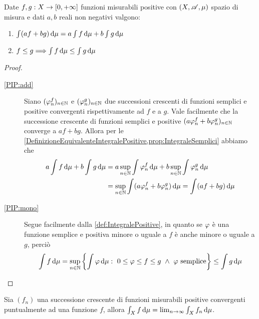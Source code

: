 \begin{proposition}\label{prop:IntegralePositive}
	Date $f,g:X\to[0,+\infty]$ funzioni misurabili positive con $(X,\mathscr A,\mu)$ spazio di misura e dati $a,b$ reali non negativi valgono:
	\begin{enumerate}
		\item $\int (af+bg)\,\mathrm d\mu=a\int f\,\mathrm d\mu+b\int g\,\mathrm d\mu$ \label{PIP:add}
		\item $f\le g\Longrightarrow \int f\,\mathrm d\mu\le \int g\,\mathrm d\mu$ \label{PIP:mono}
	\end{enumerate}
\end{proposition}
\begin{proof}
	\begin{description}
		\item[\ref{PIP:add}] Siano $(\varphi_n^f)_{n\in\mathbb N}$ e $(\varphi_n^g)_{n\in\mathbb N}$ due successioni crescenti di funzioni semplici e positive convergenti rispettivamente ad $f$ e a $g$. Vale facilmente che la successione crescente di funzioni semplici e positive $(a\varphi_n^f+b\varphi_n^g)_{n\in\mathbb N}$ converge a $af+bg$. Allora per le \cref{DefinizioneEquivalenteIntegralePositive,prop:IntegraleSemplici} abbiamo che
		\begin{equation*}
		\begin{split}
			a\int f\,\mathrm d\mu+b\int g\,\mathrm d\mu&=a\sup_{n\in\mathbb N}\int \varphi_n^f\,\mathrm d\mu+b\sup_{n\in\mathbb N}\int \varphi_n^g\,\mathrm d\mu \\
			&=\sup_{n\in\mathbb N}\int (a\varphi_n^f+b\varphi_n^g)\,\mathrm d\mu=\int (af+bg)\,\mathrm d\mu
		\end{split}
		\end{equation*}
		
		\item[\ref{PIP:mono}] Segue facilmente dalla \cref{def:IntegralePositive}, in quanto se $\varphi$ è una funzione semplice e positiva minore o uguale a $f$ è anche minore o uguale a $g$, perciò
		\begin{equation*}
		\int f\de\mu=\sup_{n\in\N}\left\{\int\simp\de \mu:\ 0\le \simp\le f\le g\ \wedge\ \simp \text{ semplice}\right\}\le \int g\de\mu
	\end{equation*}
	\end{description}
\end{proof}

\begin{theorem}\label{thm:BeppoLevi}
	Sia $(f_n)$ una successione crescente di funzioni misurabili positive convergenti puntualmente ad una funzione $f$, allora $\int_Xf\,\mathrm d\mu=\lim_{n\to\infty}\int_Xf_n\,\mathrm d\mu$.
\end{theorem}

